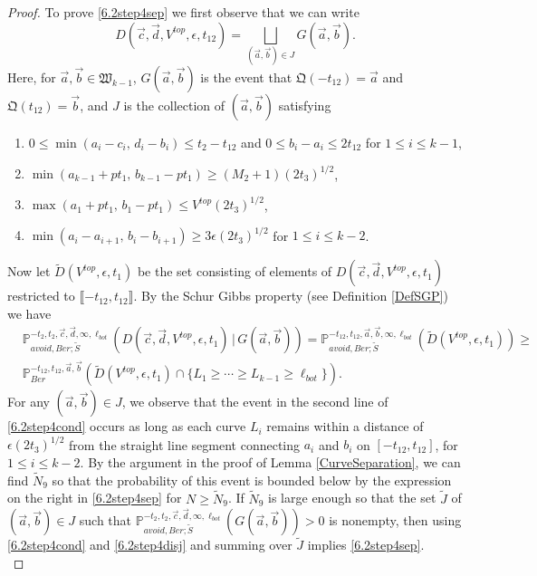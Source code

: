 \begin{proof}
	To prove \eqref{6.2step4sep} we first observe that we can write
	\begin{equation}\label{6.2step4disj}
	D(\vec c, \vec d, V^{top}, \epsilon,t_{12}) = \bigsqcup_{(\vec{a},\vec{b})\in J} G(\vec{a},\vec{b}).
	\end{equation}
	Here, for $\vec{a},\vec{b}\in\mathfrak{W}_{k-1}$, $G(\vec{a},\vec{b})$ is the event that $\mathfrak{Q}(-t_{12}) = \vec{a}$ and $\mathfrak{Q}(t_{12}) = \vec{b}$, and $J$ is the collection of $(\vec{a},\vec{b})$ satisfying
	\begin{enumerate}[label = (\arabic*)]
		
		\item $ 0 \leq \min(a_i - c_i,\, d_i - b_i) \leq t_2 - t_{12}$ and $0\leq b_i-a_i \leq 2t_{12}$ for $1\leq i\leq k-1$,
		
		\item $\min(a_{k-1} + pt_1,\, b_{k-1} - pt_1) \geq (M_2+1)(2t_3)^{1/2}$,
		
		\item $\max(a_1 + pt_1,\, b_1 - pt_1) \leq V^{top}(2t_3)^{1/2}$,
		
		\item $\min(a_i-a_{i+1}, \, b_i-b_{i+1}) \geq 3\epsilon(2t_3)^{1/2}$ for $1\leq i\leq k-2$.
		
	\end{enumerate}
	Now let $\tilde{D}(V^{top},\epsilon,t_1)$ be the set consisting of elements of $D(\vec{c},\vec{d},V^{top},\epsilon,t_1)$ restricted to $\llbracket -t_{12},t_{12}\rrbracket$. By the Schur Gibbs property (see Definition \ref{DefSGP}) we have
	\begin{equation}\label{6.2step4cond}
	\begin{split}
	&\mathbb{P}^{-t_2,t_2,\vec{c},\vec{d},\infty,\ell_{bot}}_{avoid,Ber;\tilde S}\left(D(\vec{c},\vec{d},V^{top},\epsilon,t_1) \,\big|\,G(\vec{a},\vec{b})\right) = \mathbb{P}^{-t_{12},t_{12},\vec{a},\vec{b},\infty,\ell_{bot}}_{avoid,Ber;\tilde S}\left(\tilde D(V^{top},\epsilon,t_1)\right) \geq \\
	&\mathbb{P}^{-t_{12},t_{12},\vec{a},\vec{b}}_{Ber}\left(\tilde D(V^{top},\epsilon,t_1)\cap \{L_1\geq\cdots\geq L_{k-1}\geq\ell_{bot}\}\right).
	\end{split}
	\end{equation}
	For any $(\vec{a},\vec{b})\in J$, we observe that the event in the second line of \eqref{6.2step4cond} occurs as long as each curve $L_i$ remains within a distance of $\epsilon(2t_3)^{1/2}$ from the straight line segment connecting $a_i$ and $b_i$ on $[-t_{12},t_{12}]$, for $1\leq i\leq k-2$. By the argument in the proof of Lemma \ref{CurveSeparation}, we can find $\tilde{N}_9$ so that the probability of this event is bounded below by the expression on the right in \eqref{6.2step4sep} for $N\geq\tilde{N}_9$. If $\tilde{N}_9$ is large enough so that the set $\tilde{J}$ of $(\vec{a},\vec{b})\in J$ such that $\mathbb{P}^{-t_2,t_2,\vec{c},\vec{d},\infty,\ell_{bot}}_{avoid,Ber;\tilde S}(G(\vec{a},\vec{b})) > 0$ is nonempty, then using \eqref{6.2step4cond} and \eqref{6.2step4disj} and summing over $\tilde{J}$ implies \eqref{6.2step4sep}.\\
	

\end{proof}
